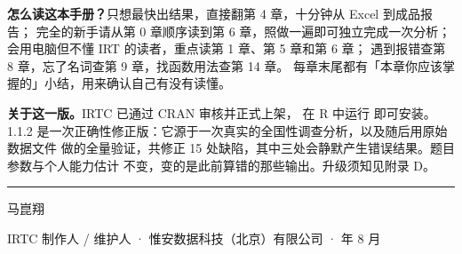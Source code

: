 \textbf{怎么读这本手册？}\quad 只想最快出结果，直接翻第 4 章，十分钟从 Excel 到成品报告；
完全的新手请从第 0 章顺序读到第 6 章，照做一遍即可独立完成一次分析；
会用电脑但不懂 IRT 的读者，重点读第 1 章、第 5 章和第 6 章；
遇到报错查第 8 章，忘了名词查第 9 章，找函数用法查第 14 章。
每章末尾都有「本章你应该掌握的」小结，用来确认自己有没有读懂。

\textbf{关于这一版。}\quad IRTC 已通过 CRAN 审核并正式上架，
在 R 中运行  即可安装。
1.1.2 是一次正确性修正版：它源于一次真实的全国性调查分析，以及随后用原始数据文件
做的全量验证，共修正 15 处缺陷，其中三处会静默产生错误结果。题目参数与个人能力估计
不变，变的是此前算错的那些输出。升级须知见附录 D。

\vspace{0.7cm}
{\color{IRTCgold}\rule{2.6cm}{1.2pt}}\par
\vspace{0.35cm}
{\HeadFont\fontsize{12}{17}\selectfont\color{IRTCink}马崑翔}\par
{\LightFont\fontsize{10}{15}\selectfont\color{IRTCslate}%
 IRTC 制作人 / 维护人 \quad · \quad 惟安数据科技（北京）有限公司 \quad ·  年 8 月}\par
\clearpage
